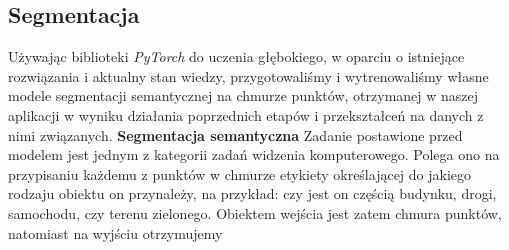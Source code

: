 \subsection{Segmentacja}
Używając biblioteki \textit{PyTorch} do uczenia głębokiego, w oparciu o istniejące rozwiązania i aktualny stan wiedzy, przygotowaliśmy i wytrenowaliśmy własne modele segmentacji semantycznej na chmurze punktów, otrzymanej w naszej aplikacji w wyniku działania poprzednich etapów i przekształceń na danych z nimi związanych. 
\textbf{Segmentacja semantyczna}
Zadanie postawione przed modelem jest jednym z kategorii zadań widzenia komputerowego. Polega ono na przypisaniu każdemu z punktów w chmurze etykiety określającej do jakiego rodzaju obiektu on przynależy, na przykład: czy jest on częścią budynku, drogi, samochodu, czy terenu zielonego. Obiektem wejścia jest zatem chmura punktów, natomiast na wyjściu otrzymujemy 